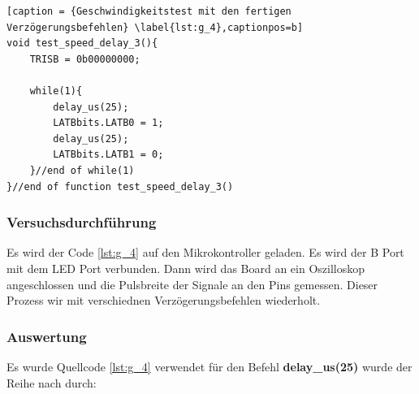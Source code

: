 \documentclass[12pt,a4paper]{article}
\begin{document}
\lstset{language=C, basicstyle=\tiny}
\begin{lstlisting}[caption = {Geschwindigkeitstest mit den fertigen Verzögerungsbefehlen} \label{lst:g_4},captionpos=b]
void test_speed_delay_3(){
	TRISB = 0b00000000;
	
	while(1){
		delay_us(25);
		LATBbits.LATB0 = 1;
		delay_us(25);
		LATBbits.LATB1 = 0;
	}//end of while(1)
}//end of function test_speed_delay_3()
\end{lstlisting}



\subsubsection*{Versuchsdurchführung}

Es wird der Code \ref{lst:g_4} auf den Mikrokontroller geladen. Es wird der B Port mit dem LED Port verbunden. Dann wird das Board an ein Oszilloskop angeschlossen und die Pulsbreite der Signale an den Pins gemessen. Dieser Prozess wir mit verschiednen Verzögerungsbefehlen wiederholt.


\subsubsection*{Auswertung}

Es wurde Quellcode \ref{lst:g_4} verwendet für den Befehl \textbf{delay\_us(25)} wurde der Reihe nach durch:
\end{document}
